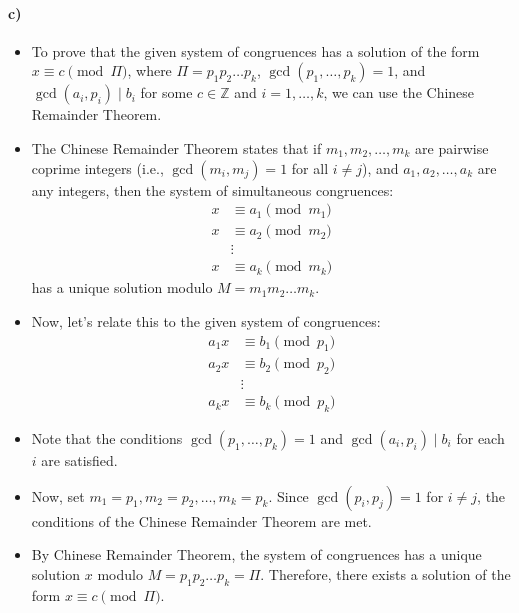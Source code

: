 \documentclass[12pt]{article}
\begin{document}
\paragraph*{c)}
\begin{itemize}
    \item To prove that the given system of congruences has a solution of the form $x \equiv c \pmod{\Pi}$, where $\Pi = p_1p_2 \dots p_k$, $\gcd(p_1, \ldots, p_k) = 1$, and $\gcd(a_i, p_i) \mid b_i$ for some $c \in \mathbb{Z}$ and $i = 1, \ldots, k$, we can use the Chinese Remainder Theorem.
    \item The Chinese Remainder Theorem states that if $m_1, m_2, \ldots, m_k$ are pairwise coprime integers (i.e., $\gcd(m_i, m_j) = 1$ for all $i \neq j$), and $a_1, a_2, \ldots, a_k$ are any integers, then the system of simultaneous congruences:
    \begin{equation*}
        \begin{split}
            x &\equiv a_1 \pmod{m_1} \\
            x &\equiv a_2 \pmod{m_2} \\
            & \vdots \\
            x &\equiv a_k \pmod{m_k}
        \end{split}
    \end{equation*}
    has a unique solution modulo $M = m_1m_2 \dots m_k$.
    \item Now, let's relate this to the given system of congruences:
    \begin{equation*}
        \begin{split}
            a_1x &\equiv b_1 \pmod{p_1} \\
            a_2x &\equiv b_2 \pmod{p_2} \\
            & \vdots \\
            a_kx &\equiv b_k \pmod{p_k}
        \end{split}
    \end{equation*}
    \item Note that the conditions $\gcd(p_1, \ldots, p_k) = 1$ and $\gcd(a_i, p_i) \mid b_i$ for each $i$ are satisfied.
    \item Now, set $m_1 = p_1, m_2 = p_2, \ldots, m_k = p_k$. Since $\gcd(p_i, p_j) = 1$ for $i \neq j$, the conditions of the Chinese Remainder Theorem are met.
    \item By Chinese Remainder Theorem, the system of congruences has a unique solution $x$ modulo $M = p_1p_2 \dots p_k = \Pi$. Therefore, there exists a solution of the form $x \equiv c \pmod{\Pi}$.
\end{itemize}{}
\end{document}
